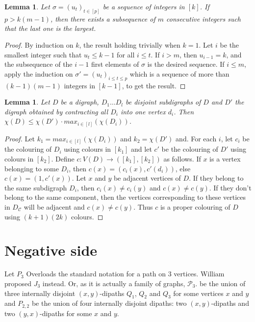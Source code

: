 \documentclass[utf8,10pt]{article}
\theoremstyle{plain}
\newtheorem{lemma}[theorem]{Lemma}
\theoremstyle{definition}
\theoremstyle{remark}
\newcommand{\nathann}[1]{{\color{blue}{\bf Nathann:} #1}}
\begin{document}
\begin{lemma}\label{max}
Let $\sigma=(u_t)_{t\in [p]}$ be a sequence of integers in $[k]$. 
If $p > k (m-1)$, then there exists a subsequence of $m$ consecutive integers such that the
last one is the largest.
\end{lemma}

\begin{proof}
By induction on $k$, the result holding trivially when $k=1$. 
Let $i$ be the smallest integer such that $u_t\leq k-1$ for all $i\leq t$.
If $i>m$, then $u_{i-1}=k$, and the subsequence of the $i-1$ first elements of $\sigma$ is the desired sequence.
If $i\leq m$, apply the induction on $\sigma'=(u_t)_{i\leq t\leq p}$ which is a sequence of more than $(k-1)(m-1)$ integers in $[k-1]$, to get the result. 
\end{proof}

\begin{lemma}\label{lem:contrac}
Let $D$ be a digraph, $D_1 \dots D_l$ be disjoint subdigraphs of $D$ and $D'$ the digraph obtained by contracting all $D_i$ into
one vertex $d_i$. Then $\chi(D) \leq \chi(D')\cdot max_{i \in [l]}(\chi(D_i))$.
\end{lemma}

\begin{proof}

Let $k_1 = max_{i \in [l]}(\chi(D_i))$ and $k_2 = \chi(D')$ and. For each $i$, let $c_i$ be the colouring of $D_i$ using colours in $[k_1]$ and let
$c'$ be the colouring of $D'$ using colours in $[k_2]$. 
Define $c : V(D) \rightarrow ([k_1],[k_2])$ as follows. If $x$ is a vertex belonging to some $D_i$, then $c(x) = (c_i(x), c'(d_i))$, else $c(x) =(1,c'(x))$. 
Let $x$ and $y$ be adjacent vertices of $D$. If they belong to the same subdigraph $D_i$, then $c_i(x) \not = c_i(y)$ and $c(x) \not = c(y)$. If they don't belong
to the same component, then the vertices corresponding to these vertices in $D_{\mathcal{C}}$ will be adjacent and $c(x) \not = c(y)$. 
Thus $c$ is a proper colouring of $D$ using $(k+1)(2k)$ colours. 
\end{proof}



\section{Negative side}

Let $P_3$ \nathann{Overloads the standard notation for a path on 3 vertices. William proposed $J_3$ instead. Or, as it is actually a family of graphs, $\mathcal P_3$.} be the union of three internally disjoint $(x,y)$-dipaths $Q_1$, $Q_2$ and $Q_3$ for some vertices $x$ and $y$ 
and $P_{2,2}$ be the union of four internally disjoint dipaths: two $(x,y)$-dipaths and two $(y,x)$-dipaths for some $x$ and $y$. 
\end{document}

